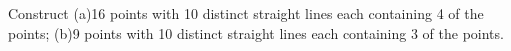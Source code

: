 Construct (a)16 points with 10 distinct straight lines each containing 4 of the points; (b)9 points with 10 distinct straight lines each containing 3 of the points.
